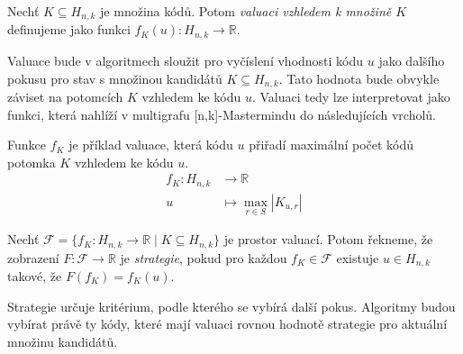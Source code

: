 



\begin{definice}[Valuace]
    Nechť $K \subseteq H_{n,k}$ je množina kódů. Potom \emph{valuaci vzhledem k množině $K$} definujeme jako funkci $f_K(u) \colon H_{n,k} \to \mathbb{R}$.
\end{definice}


Valuace bude v algoritmech sloužit pro vyčíslení vhodnosti kódu $u$ jako dalšího pokusu pro stav s množinou kandidátů $K\subseteq H_{n,k}$. Tato hodnota bude obvykle záviset na potomcích $K$ vzhledem ke kódu $u$. Valuaci tedy lze interpretovat jako funkci, která nahlíží v multigrafu [n,k]-Mastermindu do následujících vrcholů.


\begin{prikl}\label{prjednokrokfce}
    Funkce $f_K$ je příklad valuace, která kódu $u$ přiřadí maximální počet kódů potomka $K$ vzhledem ke kódu $u$.
    \begin{align*}
        f_K \colon H_{n,k} &\to \mathbb{R} \\
        u &\mapsto \max_{r\in S} |K_{u,r}|
    \end{align*}
\end{prikl}


\begin{definice}[Strategie]
    Nechť $\mathcal{F} = \{f_K\colon H_{n,k} \to \mathbb{R} \mid K \subseteq H_{n,k}\}$ je prostor valuací. Potom řekneme, že zobrazení $F \colon \mathcal{F} \to \mathbb{R}$ je \emph{strategie}, pokud pro každou $f_K \in \mathcal{F}$ existuje $u\in H_{n,k}$ takové, že $F(f_K) = f_K(u)$.
\end{definice}
Strategie určuje kritérium, podle kterého se vybírá další pokus. Algoritmy budou vybírat právě ty kódy, které mají valuaci rovnou hodnotě strategie pro aktuální množinu kandidátů. 

